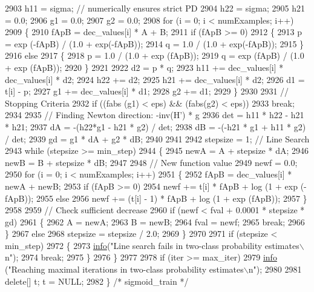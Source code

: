 \begin{DoxyCode}
2903     h11 = sigma; \textcolor{comment}{// numerically ensures strict PD}
2904     h22 = sigma;
2905     h21 = 0.0;
2906     g1  = 0.0;
2907     g2  = 0.0;
2908     \textcolor{keywordflow}{for}  (i = 0;  i < numExamples;  i++)
2909     \{
2910       fApB = dec\_values[i] * A + B;
2911       \textcolor{keywordflow}{if}  (fApB >= 0)
2912       \{
2913         p = exp (-fApB) / (1.0 + exp(-fApB));
2914         q = 1.0 / (1.0 + exp(-fApB));
2915       \}
2916       \textcolor{keywordflow}{else}
2917       \{
2918         p = 1.0 / (1.0 + exp (fApB));
2919         q = exp (fApB) / (1.0 + exp (fApB));
2920       \}
2921 
2922       d2   = p * q;
2923       h11  += dec\_values[i] * dec\_values[i] * d2;
2924       h22  += d2;
2925       h21  += dec\_values[i] * d2;
2926       d1   = t[i] - p;
2927       g1   += dec\_values[i] * d1;
2928       g2   += d1;
2929     \}
2930 
2931     \textcolor{comment}{// Stopping Criteria}
2932     \textcolor{keywordflow}{if}  ((fabs (g1) < eps)  &&  (fabs(g2) < eps))
2933       \textcolor{keywordflow}{break};
2934 
2935     \textcolor{comment}{// Finding Newton direction: -inv(H') * g}
2936     det = h11 * h22  -  h21 * h21;
2937     dA  = -(h22*g1 - h21 * g2) / det;
2938     dB  = -(-h21 * g1  +  h11 * g2) / det;
2939     gd  = g1 * dA  +  g2 * dB;
2940 
2941 
2942     stepsize = 1;    \textcolor{comment}{// Line Search}
2943     \textcolor{keywordflow}{while} (stepsize >= min\_step)
2944     \{
2945       newA = A + stepsize * dA;
2946       newB = B + stepsize * dB;
2947 
2948       \textcolor{comment}{// New function value}
2949       newf = 0.0;
2950       \textcolor{keywordflow}{for} (i = 0;  i < numExamples;  i++)
2951       \{
2952         fApB = dec\_values[i] * newA + newB;
2953         \textcolor{keywordflow}{if} (fApB >= 0)
2954           newf += t[i] * fApB + log (1 + exp (-fApB));
2955         \textcolor{keywordflow}{else}
2956           newf += (t[i] - 1) * fApB + log (1 + exp (fApB));
2957       \}
2958 
2959       \textcolor{comment}{// Check sufficient decrease}
2960       \textcolor{keywordflow}{if} (newf < fval + 0.0001 * stepsize * gd)
2961       \{
2962         A    = newA;
2963         B    = newB;
2964         fval = newf;
2965         \textcolor{keywordflow}{break};
2966       \}
2967       \textcolor{keywordflow}{else}
2968         stepsize = stepsize / 2.0;
2969     \}
2970 
2971     \textcolor{keywordflow}{if} (stepsize < min\_step)
2972     \{
2973       \hyperlink{svm2_8cpp_ab834c069665121a3467868539fde9101}{info}(\textcolor{stringliteral}{"Line search fails in two-class probability estimates\(\backslash\)n"});
2974       \textcolor{keywordflow}{break};
2975     \}
2976   \}
2977 
2978   \textcolor{keywordflow}{if}  (iter >= max\_iter)
2979     \hyperlink{svm2_8cpp_ab834c069665121a3467868539fde9101}{info} (\textcolor{stringliteral}{"Reaching maximal iterations in two-class probability estimates\(\backslash\)n"});
2980 
2981   \textcolor{keyword}{delete}[]  t;  t = NULL;
2982 \}  \textcolor{comment}{/* sigmoid\_train */}
\end{DoxyCode}
